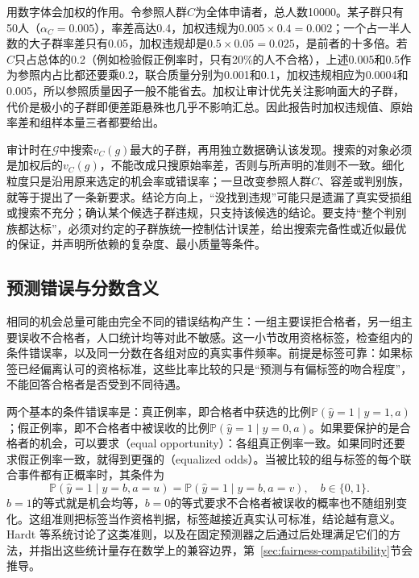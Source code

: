 用数字体会加权的作用。令参照人群$C$为全体申请者，总人数10000。某子群只有50人（$\alpha_C=0.005$），率差高达0.4，加权违规为$0.005\times0.4=0.002$；一个占一半人数的大子群率差只有0.05，加权违规却是$0.5\times0.05=0.025$，是前者的十多倍。若$C$只占总体的0.2（例如检验假正例率时，只有20\%的人不合格），上述0.005和0.5作为参照内占比都还要乘0.2，联合质量分别为0.001和0.1，加权违规相应为0.0004和0.005，所以参照质量因子一般不能省去。加权让审计优先关注影响面大的子群，代价是极小的子群即便差距悬殊也几乎不影响汇总。因此报告时加权违规值、原始率差和组样本量三者都要给出。

审计时在$\mathcal G$中搜索$v_C(g)$最大的子群，再用独立数据确认该发现。搜索的对象必须是加权后的$v_C(g)$，不能改成只搜原始率差，否则与所声明的准则不一致。细化粒度只是沿用原来选定的机会率或错误率；一旦改变参照人群$C$、容差或判别族，就等于提出了一条新要求。结论方向上，“没找到违规”可能只是遗漏了真实受损组或搜索不充分；确认某个候选子群违规，只支持该候选的结论。要支持“整个判别族都达标”，必须对约定的子群族统一控制估计误差，给出搜索完备性或近似最优的保证，并声明所依赖的复杂度、最小质量等条件。

\subsection{预测错误与分数含义}
\label{sec:fairness-prediction-comparison}

相同的机会总量可能由完全不同的错误结构产生：一组主要误拒合格者，另一组主要误收不合格者，人口统计均等对此不敏感。这一小节改用资格标签，检查组内的条件错误率，以及同一分数在各组对应的真实事件频率。前提是标签可靠：如果标签已经偏离认可的资格标准，这些比率比较的只是“预测与有偏标签的吻合程度”，不能回答合格者是否受到不同待遇。

两个基本的条件错误率是：真正例率，即合格者中获选的比例$\mathbb P(\hat y=1\mid y=1,a)$；假正例率，即不合格者中被误收的比例$\mathbb P(\hat y=1\mid y=0,a)$。如果要保护的是合格者的机会，可以要求（equal opportunity）：各组真正例率一致。如果同时还要求假正例率一致，就得到更强的（equalized odds）。当被比较的组与标签的每个联合事件都有正概率时，其条件为
\begin{equation}
 \mathbb P(\hat y=1\mid y=b,a=u)
 =\mathbb P(\hat y=1\mid y=b,a=v),
 \quad b\in\{0,1\}.
 \label{eq:fairness-equalized-odds}
\end{equation}
$b=1$的等式就是机会均等，$b=0$的等式要求不合格者被误收的概率也不随组别变化。这组准则把标签当作资格判据，标签越接近真实认可标准，结论越有意义。Hardt 等系统讨论了这类准则，以及在固定预测器之后通过后处理满足它们的方法，并指出这些统计量存在数学上的兼容边界，第~\ref{sec:fairness-compatibility}节会推导。

